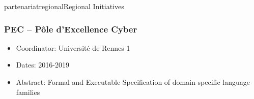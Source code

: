 \documentclass{ra2018}
\begin{document}



\begin{module}{partenariat}{regional}{Regional Initiatives}

\subsubsection*{PEC -- Pôle d'Excellence Cyber}

\begin{itemize}
	\item Coordinator: Universit\'e de Rennes 1
	\item Dates: 2016-2019
	\item Abstract: Formal and Executable Specification of domain-specific language families
\end{itemize}

\end{module}
\end{document}
